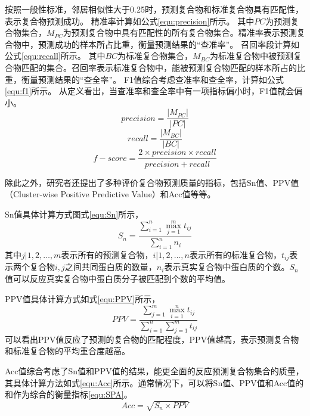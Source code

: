 按照一般性标准，邻居相似性大于0.25时，预测复合物和标准复合物具有匹配性，表示复合物预测成功。
精准率计算如公式\ref{equ:precision}所示。
其中$PC$为预测复合物集合，$M_{PC}$为预测复合物中具有匹配性的所有复合物集合。精准率表示预测复合物中，预测成功的样本所占比重，衡量预测结果的“查准率”。
召回率段计算如公式\ref{equ:recall}所示。
其中$BC$为标准复合物集合，$M_{BC}$为标准复合物中被预测复合物匹配的集合。召回率表示标准复合物中，能被预测复合物匹配的样本所占的比重，衡量预测结果的“查全率”。
F1值综合考虑查准率和查全率，计算如公式\ref{equ:f1}所示。
从定义看出，当查准率和查全率中有一项指标偏小时，F1值就会偏小。
\begin{equation}
    \label{equ:precision}
    precision=\frac{\left\lvert M_{PC}\right\rvert }{\left\lvert PC\right\rvert }
\end{equation}
\begin{equation}
    \label{equ:recall}
    recall=\frac{\left\lvert M_{BC}\right\rvert }{\left\lvert BC\right\rvert }
\end{equation}
\begin{equation}
    \label{equ:f1}
    f-score=\frac{2\times precision\times recall}{precision + recall }
\end{equation}

除此之外，研究者还提出了多种评价复合物预测质量的指标\cite{shi_protein_2011}，包括Sn值、PPV值（Cluster-wise Positive Predictive Value）和Acc值等等。

Sn值具体计算方式图式\ref{equ:Sn}所示，
\begin{equation}
    \label{equ:Sn}
    S_n=\frac{\sum_{i = 1}^{n} \max_{j=1}^{m} t_{ij}}{\sum_{i = 1}^{n}n_i}
\end{equation}
其中${j| 1,2,\dots,m }$表示所有的预测复合物，${i| 1,2,\dots,n }$表示所有的标准复合物，$t_{ij}$表示两个复合物$i,j$之间共同蛋白质的数量，$n_i$表示真实复合物中蛋白质的个数。$S_n$值可以反应真实复合物中蛋白质分子被匹配到个数的平均值。

PPV值具体计算方式如式\ref{equ:PPV}所示，
\begin{equation}
    \label{equ:PPV}
    PPV=\frac{\sum_{j = 1}^{m} \max_{i=1}^{n} t_{ij}}{\sum_{i = 1}^{n} \sum_{j = 1}^{m}   t_{ij}}
\end{equation}
可以看出PPV值反应了预测的复合物的匹配程度，PPV值越高，表示预测复合物和标准复合物的平均重合度越高。

Acc值综合考虑了Sn值和PPV值的结果，能更全面的反应预测复合物集合的质量，其具体计算方法如式\ref{equ:Acc}所示。通常情况下，可以将Sn值、PPV值和Acc值的和作为综合的衡量指标\ref{equ:SPA}。
\begin{equation}
    \label{equ:Acc}
    Acc=\sqrt{S_n\times PPV}
\end{equation}

